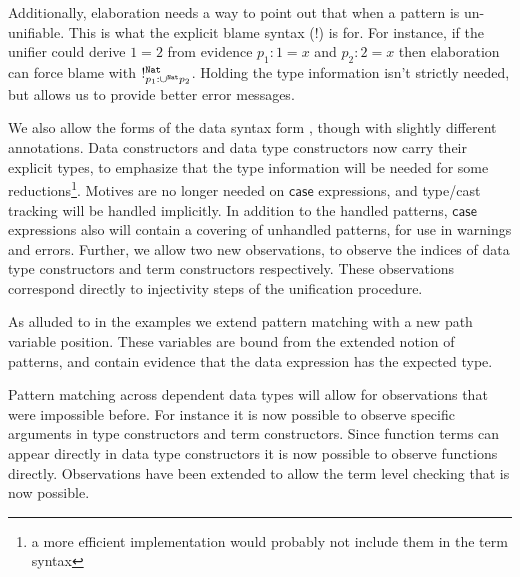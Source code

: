 Additionally, elaboration needs a way to point out that when a pattern is un-unifiable.
This is what the explicit blame syntax ($!$) is for.
For instance, if the unifier could derive $1=2$ from evidence $p_{1}:1=x$ and $p_{2}:2=x$ then elaboration can force blame with $!_{p_{1}:\cup^{\mathtt{Nat}{}}p_{2}}^{\mathtt{Nat}{}}$.
Holding the type information isn't strictly needed, but allows us to provide better error messages.
 
We also allow the forms of the data syntax form , though with slightly different annotations.
Data constructors and data type constructors now carry their explicit types, to emphasize that the type information will be needed for some reductions\footnote{
  a more efficient implementation would probably not include them in the term syntax}.
Motives are no longer needed on $\mathsf{case}$ expressions, and type/cast tracking will be handled implicitly.
In addition to the handled patterns, $\mathsf{case}$ expressions also will contain a covering of unhandled patterns, for use in warnings and errors.
Further, we allow two new observations, to observe the indices of data type constructors and term constructors respectively.
These observations correspond directly to injectivity steps of the unification procedure.
 
As alluded to in the examples we extend pattern matching with a new path variable position.
These variables are bound from the extended notion of patterns, and contain evidence that the data expression has the expected type.

Pattern matching across dependent data types will allow for observations that were impossible before.
For instance it is now possible to observe specific arguments in type constructors and term constructors.
Since function terms can appear directly in data type constructors it is now possible to observe functions directly.
Observations have been extended to allow the term level checking that is now possible.



